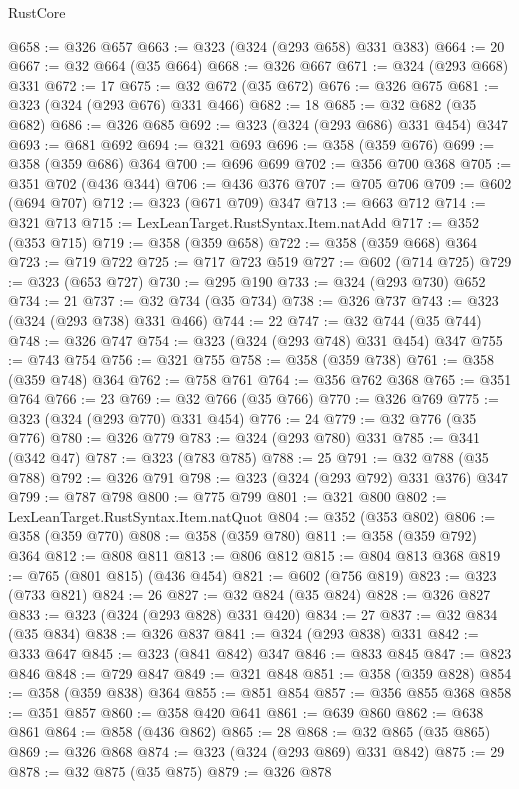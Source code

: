 \begin{lexlean}{RustCore}
\begin{coremodule}
@658 := @326 @657
@663 := @323 (@324 (@293 @658) @331 @383)
@664 := 20
@667 := @32 @664 (@35 @664)
@668 := @326 @667
@671 := @324 (@293 @668) @331
@672 := 17
@675 := @32 @672 (@35 @672)
@676 := @326 @675
@681 := @323 (@324 (@293 @676) @331 @466)
@682 := 18
@685 := @32 @682 (@35 @682)
@686 := @326 @685
@692 := @323 (@324 (@293 @686) @331 @454) @347
@693 := @681 @692
@694 := @321 @693
@696 := @358 (@359 @676)
@699 := @358 (@359 @686) @364
@700 := @696 @699
@702 := @356 @700 @368
@705 := @351 @702 (@436 @344)
@706 := @436 @376
@707 := @705 @706
@709 := @602 (@694 @707)
@712 := @323 (@671 @709) @347
@713 := @663 @712
@714 := @321 @713
@715 := LexLeanTarget.RustSyntax.Item.natAdd
@717 := @352 (@353 @715)
@719 := @358 (@359 @658)
@722 := @358 (@359 @668) @364
@723 := @719 @722
@725 := @717 @723 @519
@727 := @602 (@714 @725)
@729 := @323 (@653 @727)
@730 := @295 @190
@733 := @324 (@293 @730) @652
@734 := 21
@737 := @32 @734 (@35 @734)
@738 := @326 @737
@743 := @323 (@324 (@293 @738) @331 @466)
@744 := 22
@747 := @32 @744 (@35 @744)
@748 := @326 @747
@754 := @323 (@324 (@293 @748) @331 @454) @347
@755 := @743 @754
@756 := @321 @755
@758 := @358 (@359 @738)
@761 := @358 (@359 @748) @364
@762 := @758 @761
@764 := @356 @762 @368
@765 := @351 @764
@766 := 23
@769 := @32 @766 (@35 @766)
@770 := @326 @769
@775 := @323 (@324 (@293 @770) @331 @454)
@776 := 24
@779 := @32 @776 (@35 @776)
@780 := @326 @779
@783 := @324 (@293 @780) @331
@785 := @341 (@342 @47)
@787 := @323 (@783 @785)
@788 := 25
@791 := @32 @788 (@35 @788)
@792 := @326 @791
@798 := @323 (@324 (@293 @792) @331 @376) @347
@799 := @787 @798
@800 := @775 @799
@801 := @321 @800
@802 := LexLeanTarget.RustSyntax.Item.natQuot
@804 := @352 (@353 @802)
@806 := @358 (@359 @770)
@808 := @358 (@359 @780)
@811 := @358 (@359 @792) @364
@812 := @808 @811
@813 := @806 @812
@815 := @804 @813 @368
@819 := @765 (@801 @815) (@436 @454)
@821 := @602 (@756 @819)
@823 := @323 (@733 @821)
@824 := 26
@827 := @32 @824 (@35 @824)
@828 := @326 @827
@833 := @323 (@324 (@293 @828) @331 @420)
@834 := 27
@837 := @32 @834 (@35 @834)
@838 := @326 @837
@841 := @324 (@293 @838) @331
@842 := @333 @647
@845 := @323 (@841 @842) @347
@846 := @833 @845
@847 := @823 @846
@848 := @729 @847
@849 := @321 @848
@851 := @358 (@359 @828)
@854 := @358 (@359 @838) @364
@855 := @851 @854
@857 := @356 @855 @368
@858 := @351 @857
@860 := @358 @420 @641
@861 := @639 @860
@862 := @638 @861
@864 := @858 (@436 @862)
@865 := 28
@868 := @32 @865 (@35 @865)
@869 := @326 @868
@874 := @323 (@324 (@293 @869) @331 @842)
@875 := 29
@878 := @32 @875 (@35 @875)
@879 := @326 @878

\end{coremodule}
\end{lexlean}
